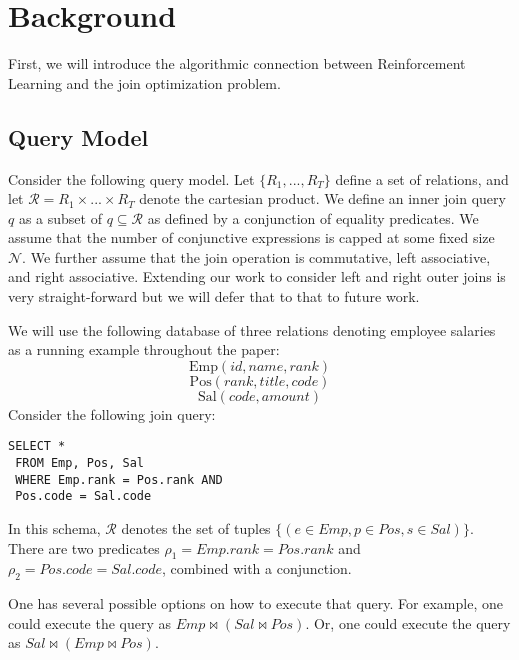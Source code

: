 \section{Background}
First, we will introduce the algorithmic connection between Reinforcement Learning and the join optimization problem.

\subsection{Query Model}
Consider the following query model.
Let $\{R_1,...,R_T\}$ define a set of relations, and let $\mathcal{R} = R_1 \times ... \times R_T$ denote the cartesian product.
We define an inner join query $q$ as a subset of $q \subseteq \mathcal{R}$ as defined by a conjunction of equality predicates. We assume that the number of conjunctive expressions is capped at some fixed size $\mathcal{N}$.
 We further assume that the join operation is commutative, left associative, and right associative.
Extending our work to consider left and right outer joins is very straight-forward but we will defer that to that to future work.

We will use the following database of three relations denoting employee salaries as a running example throughout the paper:
\[
\text{Emp}(id, name, rank)
\]
\[
\text{Pos}(rank, title, code)
\]
\[
\text{Sal}(code, amount)
\]
Consider the following join query:
\begin{lstlisting}
SELECT *
 FROM Emp, Pos, Sal
 WHERE Emp.rank = Pos.rank AND
 Pos.code = Sal.code
\end{lstlisting}
In this schema, $\mathcal{R}$ denotes the set of tuples $\{(e \in Emp, p \in Pos, s \in Sal)\}$.  There are two predicates $\rho_1 = Emp.rank = Pos.rank$ and $\rho_2 = Pos.code = Sal.code$, combined with a conjunction. 

One has several possible options on how to execute that query. For example, one could execute the query as $Emp \bowtie (Sal \bowtie Pos)$. Or, one could execute the query as $Sal \bowtie (Emp \bowtie Pos)$. 

